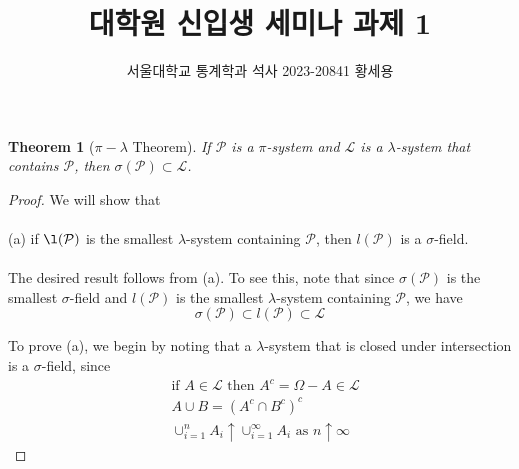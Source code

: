 \documentclass[10pt]{article}
\author{서울대학교 통계학과 석사 2023-20841 황세용}
\title{대학원 신입생 세미나 과제 1}
\newtheorem{theorem}{Theorem}
\newtheorem{proof}{Proof}
\begin{document}
\maketitle
	
\begin{theorem}[$\pi-\lambda$ Theorem]
	If $\mathcal{P}$ is a $\pi$-system and $\mathcal{L}$ is a $\lambda$-system that contains $\mathcal{P}$, then $\sigma(\mathcal{P}) \subset \mathcal{L}$.
\end{theorem}

\begin{proof}
	We will show that\\
	\\
	(a) if $\l(\mathcal{P})$ is the smallest $\lambda$-system containing $\mathcal{P}$, then $l(\mathcal{P})$ is a $\sigma$-field.\\
	\\
	The desired result follows from (a). To see this, note that since $\sigma(\mathcal{P})$ is the smallest $\sigma$-field and $l(\mathcal{P})$ is the smallest $\lambda$-system containing $\mathcal{P}$, we have
	$$\sigma(\mathcal{P}) \subset l(\mathcal{P}) \subset \mathcal{L}$$
	
	\noindent To prove (a), we begin by noting that a $\lambda$-system that is closed under intersection is a $\sigma$-field, since
	\begin{align*}
		&\text{if } A\in \mathcal{L} \text{ then } A^c=\Omega-A\in\mathcal{L}\\
		& A \cup B = (A^c \cap B^c)^c\\
		& \cup_{i=1}^{n} A_i \uparrow \cup_{i=1}^{\infty} A_i \text{ as } n \uparrow \infty
	\end{align*}
	

\end{proof}
\end{document}
